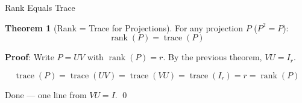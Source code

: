 \documentclass[10pt]{beamer}
\theoremstyle{definition}
\newtheorem{thm}{Theorem}[section]
\begin{document}
\begin{frame}{Rank Equals Trace}

\begin{thm}[Rank = Trace for Projections]
For any projection $P$ ($P^2 = P$):
$$\operatorname{rank}(P) = \operatorname{trace}(P)$$
\end{thm}

\textbf{Proof}:
Write $P = UV$ with $\operatorname{rank}(P) = r$. By the previous theorem, $VU = I_r$.

$$\operatorname{trace}(P) = \operatorname{trace}(UV) = \operatorname{trace}(VU) = \operatorname{trace}(I_r) = r = \operatorname{rank}(P)$$

Done --- one line from $VU = I$. \qed

\end{frame}
\end{document}
